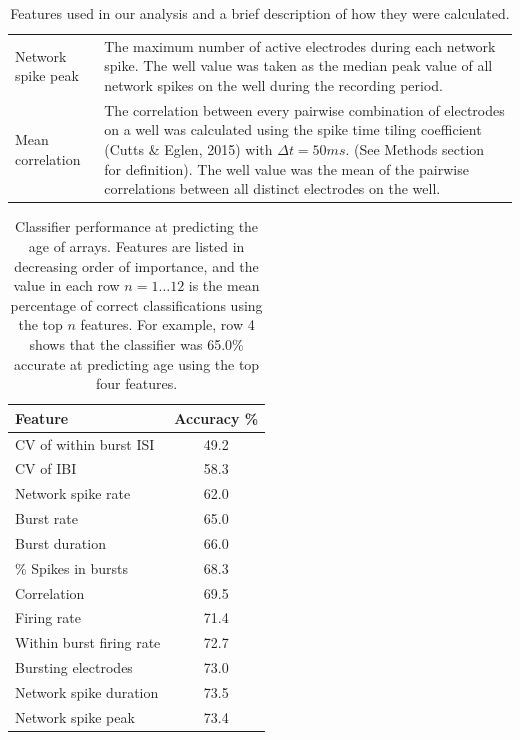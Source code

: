 \documentclass{article}\usepackage[]{graphicx}\usepackage[]{color}
\begin{document}
\begin{table}
\begin{tabular}{|l|m{11cm}|}
  		\\ Network spike peak  & The maximum number of active electrodes during each network spike. The well value was taken as the median peak value of all network spikes on the well during the recording period. 
  		\\ Mean correlation & The correlation between every pairwise combination of electrodes on a well was calculated using the spike time tiling coefficient (Cutts \& Eglen, 2015) with $\Delta t = 50ms$. (See Methods section for definition). The well value was the mean of the pairwise correlations between all distinct electrodes on the well. 
  		\\ \hline
  	\end{tabular}
  \caption{Features used in our analysis and a brief description of how
    they were calculated.}
\end{table}

\begin{table}
  \centering
  \begin{tabular}{|l|c|}
  	\hline
  	\textbf{Feature} & \textbf{Accuracy \%}
  	\\ \hline 
  	CV of within burst ISI & 49.2
  	\\CV of IBI & 58.3
  	\\ Network spike rate& 62.0
  	\\ Burst rate & 65.0
  	\\ Burst duration& 66.0
  	\\ \% Spikes in bursts & 68.3
  	\\Correlation & 69.5
  	\\Firing rate & 71.4
  	\\Within burst firing rate & 72.7
  	\\Bursting electrodes & 73.0
  	\\ Network spike duration & 73.5
  	\\Network spike peak & 73.4
  	\\ \hline
  \end{tabular}
  \caption {Classifier performance at predicting the age of
arrays. Features are listed in decreasing order of importance, and the
value in each row $n=1 \ldots 12$ is the mean percentage of correct
classifications using the top $n$ features.  For example, row 4 shows
that the classifier was 65.0\% accurate at predicting age using the
top four features. }
\end{table}
\end{document}
